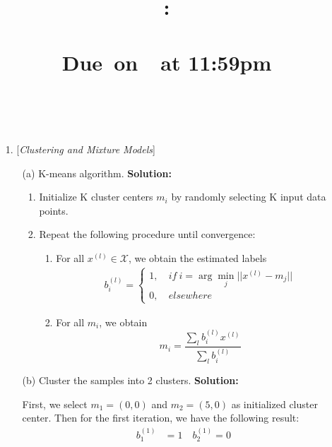 \documentclass{article}
\title{
    \vspace{2in}
    \textmd{\textbf{\hmwkClass:\\ \hmwkTitle}}\\
    \normalsize\vspace{0.1in}\small{Due\ on\ \hmwkDueDate\ at 11:59pm}\\
    \vspace{0.1in}\large{\textit{\hmwkClassInstructor}}
    \vspace{3in}
}
\author{\textbf{\hmwkAuthorName}\\ \hmwkAuthorID}
\date{}
\begin{document}
\maketitle
\pagebreak

\begin{enumerate}
	\setlength\parindent{2em}
	\item [1.] [\textit{Clustering and Mixture Models}]
	      \begin{enumerate}
		      \setlength\parindent{2em}
		      \item [(a)] K-means algorithm.\newline
		            {\bf Solution:}
		            \begin{enumerate}
                        \item Initialize K cluster centers $m_i$ by randomly selecting K input data points.
                        \item Repeat the following procedure until convergence:
                        \begin{enumerate}
                            \item For all $x^{(l)}\in\mathcal{X}$, we obtain the estimated labels
                            \begin{align*}
                                b_i^{(l)} = \left\{\begin{aligned}
                                    1,\ &if\ i=\arg\min_j||x^{(l)}-m_j||\\
                                    0,\ &elsewhere
                                \end{aligned}\right.
                            \end{align*}
                        \item For all $m_i$, we obtain 
                        \[m_i=\frac{\sum_lb_i^{(l)}x^{(l)}}{\sum_lb_i^{(l)}}\]
                        \end{enumerate}
                    \end{enumerate}
		      \item [(b)] Cluster the samples into 2 clusters.\newline
		      {\bf Solution:}
              \par First, we select $m_1 = (0,0)$ and $m_2=(5,0)$ as initialized cluster center. Then for the first iteration, we have the following result:
              \begin{align*}
                b_1^{(1)}&=1\quad b_2^{(1)}=0\\

\end{align*}
\end{enumerate}
\end{enumerate}
\end{document}

